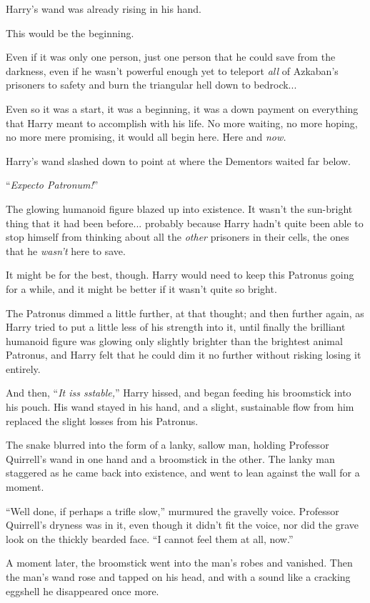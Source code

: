 Harry's wand was already rising in his hand.

This would be the beginning.

Even if it was only one person, just one person that he could save from the darkness, even if he wasn't powerful enough yet to teleport \emph{all} of Azkaban's prisoners to safety and burn the triangular hell down to bedrock...

Even so it was a start, it was a beginning, it was a down payment on everything that Harry meant to accomplish with his life. No more waiting, no more hoping, no more mere promising, it would all begin here. Here and \emph{now.}

Harry's wand slashed down to point at where the Dementors waited far below.

``\emph{Expecto Patronum!}''

The glowing humanoid figure blazed up into existence. It wasn't the sun-bright thing that it had been before... probably because Harry hadn't quite been able to stop himself from thinking about all the \emph{other} prisoners in their cells, the ones that he \emph{wasn't} here to save.

It might be for the best, though. Harry would need to keep this Patronus going for a while, and it might be better if it wasn't quite so bright.

The Patronus dimmed a little further, at that thought; and then further again, as Harry tried to put a little less of his strength into it, until finally the brilliant humanoid figure was glowing only slightly brighter than the brightest animal Patronus, and Harry felt that he could dim it no further without risking losing it entirely.

And then, ``\emph{It iss sstable,}'' Harry hissed, and began feeding his broomstick into his pouch. His wand stayed in his hand, and a slight, sustainable flow from him replaced the slight losses from his Patronus.

The snake blurred into the form of a lanky, sallow man, holding Professor Quirrell's wand in one hand and a broomstick in the other. The lanky man staggered as he came back into existence, and went to lean against the wall for a moment.

``Well done, if perhaps a trifle slow,'' murmured the gravelly voice. Professor Quirrell's dryness was in it, even though it didn't fit the voice, nor did the grave look on the thickly bearded face. ``I cannot feel them at all, now.''

A moment later, the broomstick went into the man's robes and vanished. Then the man's wand rose and tapped on his head, and with a sound like a cracking eggshell he disappeared once more.

